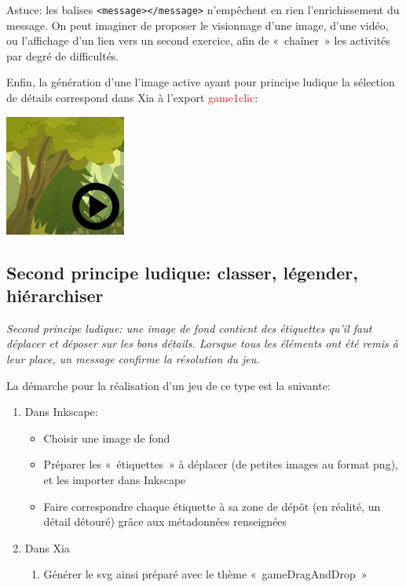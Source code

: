 \documentclass[a4paper,12pt]{report}
\newcommand{\chemin}[1]{\textcolor{red}{#1}}
\begin{document}
Astuce: les balises \verb|<message></message>| n'empêchent en rien l'enrichissement du message. 
On peut imaginer de proposer le visionnage d'une image, d'une vidéo, ou l'affichage d'un lien vers un second exercice, afin 
de «~chaîner~» les activités par degré de difficultés.

Enfin, la génération d'une l'image active ayant pour principe ludique la sélection de détails
correspond dans Xia à l'export \chemin{game1clic}:

\begin{center}
\includegraphics[scale=0.7]{./images/game1clic} 
\end{center}


\subsection{Second principe ludique: classer, légender, hiérarchiser}

\textit{Second principe ludique: une image de fond contient des étiquettes qu'il faut déplacer et 
déposer sur les bons détails. Lorsque tous les éléments ont été remis à leur place, un message 
confirme la résolution du jeu.}

La démarche pour la réalisation d'un jeu de ce type est la suivante:
\begin{enumerate}
 \item Dans Inkscape:
\begin{itemize}
 \item Choisir une image de fond
 \item Préparer les «~étiquettes~» à déplacer (de petites images au format png), 
 et les importer dans Inkscape
 \item Faire correspondre chaque étiquette à sa zone de dépôt (en réalité, un détail détouré)
 grâce aux métadonnées renseignées
\end{itemize}
 \item Dans Xia
 \begin{enumerate}
  \item Générer le svg ainsi préparé avec le thème «~gameDragAndDrop~»
 \end{enumerate}
\end{enumerate}
\end{document}
